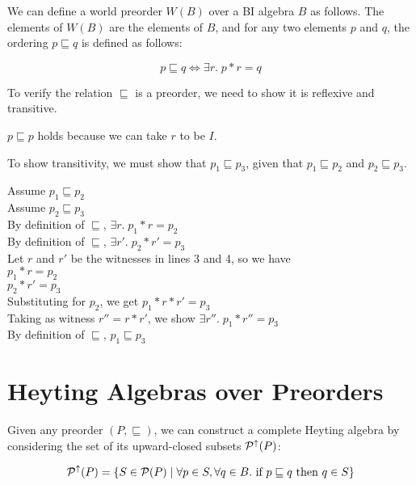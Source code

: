 We can define a world preorder $W(B)$ over a BI algebra $B$ as
follows.  The elements of $W(B)$ are the elements of $B$, and for any
two elements $p$ and $q$, the ordering $p \sqsubseteq q$ is defined as
follows:

\begin{displaymath}
p \sqsubseteq q \iff \exists r.\; p * r = q
\end{displaymath}

To verify the relation $\sqsubseteq$ is a preorder, we need to 
show it is reflexive and transitive. 

$p \sqsubseteq p$ holds because we can take $r$ to be $I$. 


To show transitivity, we must show that $p_1 \sqsubseteq p_3$, given
that $p_1 \sqsubseteq p_2$ and $p_2 \sqsubseteq p_3$.

\begin{tabbedproof}
\oo Assume $p_1 \sqsubseteq p_2$  \\
\oo Assume $p_2 \sqsubseteq p_3$  \\
\ooo By definition of $\sqsubseteq$, $\exists r.\; p_1 * r = p_2$ \\
\ooo By definition of $\sqsubseteq$, $\exists r'.\; p_2 * r' = p_3$ \\
\ooo Let $r$ and $r'$ be the witnesses in lines 3 and 4, so we have \\
\oooo $p_1 * r = p_2$ \\
\oooo $p_2 * r' = p_3$ \\
\oooo Substituting for $p_2$, we get $p_1 * r * r' = p_3$ \\
\oooo Taking as witness $r'' = r * r'$, we show $\exists r''.\; p_1 * r'' = p_3$ \\
\ooo By definition of $\sqsubseteq$, $p_1 \sqsubseteq p_3$ \\
\end{tabbedproof}

\section{Heyting Algebras over Preorders}

Given any preorder $(P, \sqsubseteq)$, we can construct a complete
Heyting algebra by considering the set of its upward-closed subsets
$\mathcal{P}^{\uparrow}({P})$:

\begin{displaymath}
\mathcal{P}^{\uparrow}({P}) = 
  \{ S \in \mathcal{P}(P) \;|\;
     \forall p \in S, \forall q \in B. \mbox{ if } p \sqsubseteq q \mbox{ then } q \in S 
  \}
\end{displaymath}

